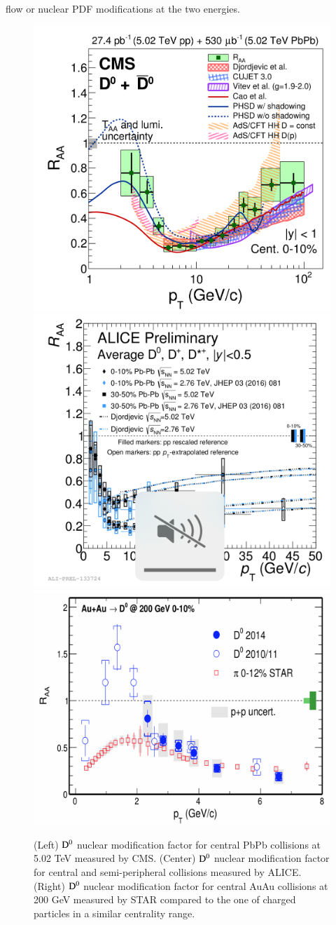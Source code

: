 \documentclass{webofc}
\begin{document}
flow or nuclear PDF modifications at the two energies.
\begin{figure}[ht]
\centering
\includegraphics[width=.32\textwidth]{Plots/DRAACMS010}
\includegraphics[width=.32\textwidth]{Plots/DRAAALICECentrality502}
\includegraphics[width=.33\textwidth]{Plots/DRAASTARAuAu}
\caption{(Left) $\rm D^{0}$ nuclear modification factor for central PbPb collisions at 5.02 TeV measured by CMS. (Center) $\rm D^{0}$ nuclear modification factor for central and semi-peripheral collisions measured by ALICE. 
(Right) $\rm D^{0}$ nuclear modification factor for central AuAu collisions at 200 GeV measured by STAR compared to the one of charged particles in a similar centrality range. }
\label{fig:DRAA}     
\end{figure}
\end{document}

